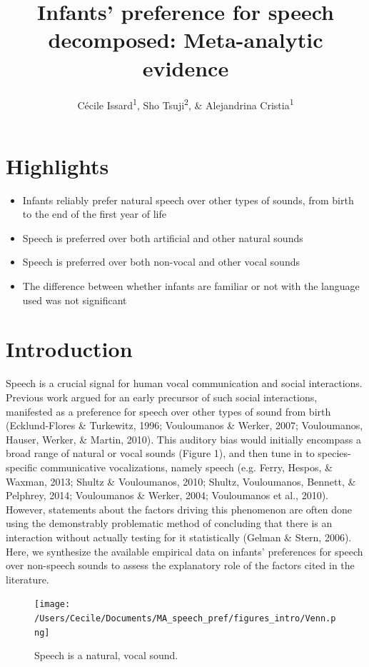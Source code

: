 \documentclass[man]{apa6}
\title{Infants' preference for speech decomposed: Meta-analytic evidence}
\author{Cécile Issard\textsuperscript{1}, Sho Tsuji\textsuperscript{2}, \&
Alejandrina Cristia\textsuperscript{1}}
\date{}
\affiliation{
\vspace{0.5cm}
\textsuperscript{1} Laboratoire de Sciences Cognitives et Psycholinguistique, Ecole Normale Supérieure, Département d'Études Cognitives\\\textsuperscript{2} International Research Center for Neurointelligence, The University of Tokyo}
\providecommand{\tightlist}{%
  \setlength{\itemsep}{0pt}\setlength{\parskip}{0pt}}
\begin{document}
\maketitle

\section{Highlights}\label{highlights}

\begin{itemize}
\tightlist
\item
  Infants reliably prefer natural speech over other types of sounds,
  from birth to the end of the first year of life
\item
  Speech is preferred over both artificial and other natural sounds
\item
  Speech is preferred over both non-vocal and other vocal sounds
\item
  The difference between whether infants are familiar or not with the
  language used was not significant
\end{itemize}

\section{Introduction}\label{introduction}

Speech is a crucial signal for human vocal communication and social
interactions. Previous work argued for an early precursor of such social
interactions, manifested as a preference for speech over other types of
sound from birth (Ecklund-Flores \& Turkewitz, 1996; Vouloumanos \&
Werker, 2007; Vouloumanos, Hauser, Werker, \& Martin, 2010). This
auditory bias would initially encompass a broad range of natural or
vocal sounds (Figure 1), and then tune in to species-specific
communicative vocalizations, namely speech (e.g. Ferry, Hespos, \&
Waxman, 2013; Shultz \& Vouloumanos, 2010; Shultz, Vouloumanos, Bennett,
\& Pelphrey, 2014; Vouloumanos \& Werker, 2004; Vouloumanos et al.,
2010). However, statements about the factors driving this phenomenon are
often done using the demonstrably problematic method of concluding that
there is an interaction without actually testing for it statistically
(Gelman \& Stern, 2006). Here, we synthesize the available empirical
data on infants' preferences for speech over non-speech sounds to assess
the explanatory role of the factors cited in the literature.

\begin{figure}
\centering
\texttt{[image: /Users/Cecile/Documents/MA\_speech\_pref/figures\_intro/Venn.png]}
\caption{\label{fig:unnamed-chunk-1}Speech is a natural, vocal sound.}
\end{figure}
\end{document}
